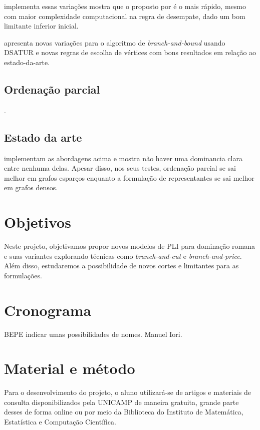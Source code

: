 \documentclass[11pt]{article}
\begin{document}
\textcite{Ternier2017ExactAlgorithmsVertex} implementa essas variações mostra que o proposto por \textcite{Sewell1996improvedalgorithmexact} é o mais rápido, mesmo com maior complexidade computacional na regra de desempate, dado um bom limitante inferior inicial.

\textcite{Ternier2017ExactAlgorithmsVertex} apresenta novas variações para o algoritmo de \emph{branch-and-bound} usando DSATUR e novas regras de escolha de vértices com bons resultados em relação ao estado-da-arte.
\subsection{Ordenação parcial}
\label{sec:org1eef8c3}
\textcites{Jabrayilov2018NewIntegerLinear}[][]{Jabrayilov2022StrengthenedPartialOrdering}.
\subsection{Estado da arte}
\label{sec:org94c71ea}
\textcite{Jabrayilov2018NewIntegerLinear} implementam as abordagens acima e mostra não haver uma dominancia clara entre nenhuma delas.
Apesar disso, nos seus testes, ordenação parcial se sai melhor em grafos esparços enquanto a formulação de representantes se sai melhor em grafos densos.
\section{Objetivos}
\label{sec:orgcb2ed60}
Neste projeto, objetivamos propor novos modelos de PLI para dominação romana e suas variantes explorando técnicas como \emph{branch-and-cut} e \emph{branch-and-price}.
Além disso, estudaremos a possibilidade de novos cortes e limitantes para as formulações.

\autocite{Lima2022Exactsolutionnetwork}
\autocite{Pessoa2021SolvingBinPacking}
\section{Cronograma}
\label{sec:org8e9e964}
BEPE indicar umas possibilidades de nomes. Manuel Iori.

\section{Material e método}
\label{sec:org8846321}
Para o desenvolvimento do projeto, o aluno utilizará-se de artigos e materiais de consulta disponibilizados pela UNICAMP de maneira gratuita, grande parte desses de forma online ou por meio da Biblioteca do Instituto de Matemática, Estatística e Computação Científica.
\end{document}
